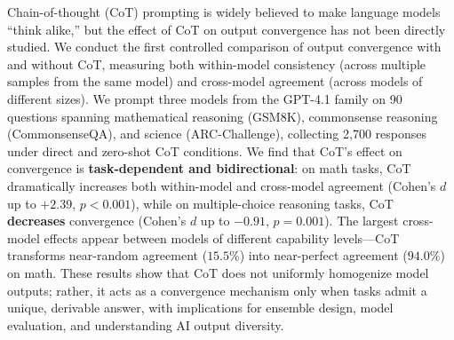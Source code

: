 Chain-of-thought (CoT) prompting is widely believed to make language models ``think alike,'' but the effect of CoT on output convergence has not been directly studied. We conduct the first controlled comparison of output convergence with and without CoT, measuring both within-model consistency (across multiple samples from the same model) and cross-model agreement (across models of different sizes). We prompt three models from the GPT-4.1 family on 90 questions spanning mathematical reasoning (GSM8K), commonsense reasoning (CommonsenseQA), and science (ARC-Challenge), collecting 2,700 responses under direct and zero-shot CoT conditions. We find that CoT's effect on convergence is \textbf{task-dependent and bidirectional}: on math tasks, CoT dramatically increases both within-model and cross-model agreement (Cohen's $d$ up to $+2.39$, $p < 0.001$), while on multiple-choice reasoning tasks, CoT \textbf{decreases} convergence (Cohen's $d$ up to $-0.91$, $p = 0.001$). The largest cross-model effects appear between models of different capability levels---CoT transforms near-random agreement ($15.5\%$) into near-perfect agreement ($94.0\%$) on math. These results show that CoT does not uniformly homogenize model outputs; rather, it acts as a convergence mechanism only when tasks admit a unique, derivable answer, with implications for ensemble design, model evaluation, and understanding AI output diversity.
